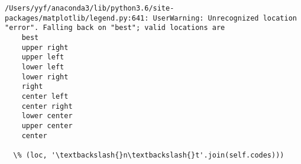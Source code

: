 \documentclass[11pt]{article}
\begin{document}
    \begin{Verbatim}[commandchars=\\\{\}]
/Users/yyf/anaconda3/lib/python3.6/site-packages/matplotlib/legend.py:641: UserWarning: Unrecognized location "error". Falling back on "best"; valid locations are
	best
	upper right
	upper left
	lower left
	lower right
	right
	center left
	center right
	lower center
	upper center
	center

  \% (loc, '\textbackslash{}n\textbackslash{}t'.join(self.codes)))

    \end{Verbatim}

    \begin{center}
    \end{center}
    { \hspace*{\fill} \\}
    

    
    
    
    
\end{document}
